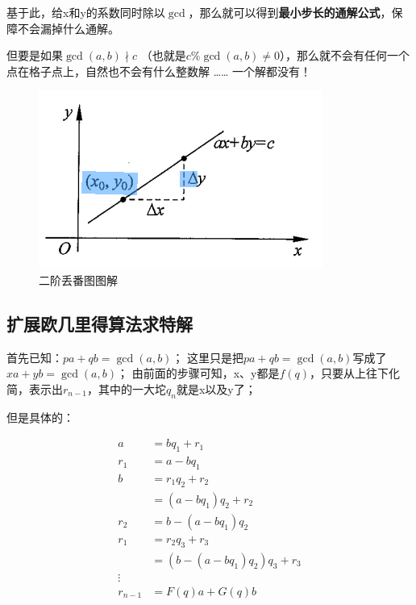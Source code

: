 \documentclass[12pt]{article}
\begin{document}
基于此，给x和y的系数同时除以$\gcd$，那么就可以得到\textbf{最小步长的通解公式}，保障不会漏掉什么通解。


但要是如果\(\gcd(a,b) \nmid c\) （也就是$c \% \gcd(a,b) \neq 0$），那么就不会有任何一个点在格子点上，自然也不会有什么整数解 …… 一个解都没有！

\begin{figure}[htb!]
    \centering
    \includegraphics[width=\textwidth]{./images/二阶丢番图.png}
    \caption{二阶丢番图图解}
    \label{fig.sth}
\end{figure}

\subsection{扩展欧几里得算法求特解}

首先已知：$pa+qb=\gcd(a,b)$；
这里只是把$pa+qb=\gcd(a,b)$写成了$xa+yb=\gcd(a,b)$；
由前面的步骤可知，x、y都是$f(q)$，只要从上往下化简，表示出$r_{n-1}$，其中的一大坨$q_{n}$就是x以及y了；

但是具体的：

\begin{align}
    a &= bq_{1} + r_{1} \\
    r_{1} &= a - bq_{1} \\
    b &= r_{1}q_{2} + r_{2} \\ \nonumber &= (a - bq_{1})q_{2} + r_{2} \\
    r_{2} &= b - (a - bq_{1})q_{2}\\
    r_{1} &= r_{2}q_{3} + r_{3} \\ \nonumber &= (b - (a - bq_{1})q_{2})q_{3} + r_{3}\\
    \vdots\nonumber \\
    r_{n-1}&=F(q)a+G(q)b
\end{align}
\end{document}
